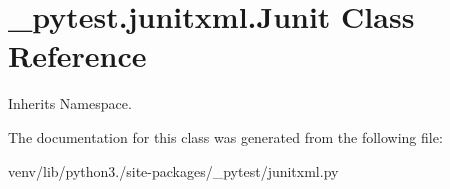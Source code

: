 \hypertarget{class__pytest_1_1junitxml_1_1_junit}{}\section{\+\_\+pytest.\+junitxml.\+Junit Class Reference}
\label{class__pytest_1_1junitxml_1_1_junit}


Inherits Namespace.



The documentation for this class was generated from the following file\+:\begin{DoxyCompactItemize}
\item 
venv/lib/python3./site-\/packages/\+\_\+pytest/junitxml.\+py\end{DoxyCompactItemize}
